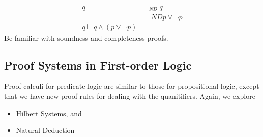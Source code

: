 \documentclass[english, 11pt]{article}
\begin{document}

\begin{align*}
  q & \vdash_{ND} q \\
    & \vdash{ND} p \lor \neg p \\
    q \vdash q \land (p \lor \neg p)
\end{align*}
Be familiar with soundness and completeness proofs.

\subsection{Proof Systems in First-order Logic}

  Proof calculi for predicate logic are similar to those for propositional logic, except that we have new proof rules for dealing with the quanitifiers. Again, we explore
  \begin{itemize}
    \item Hilbert Systems, and
    \item Natural Deduction
  \end{itemize}
\end{document}
